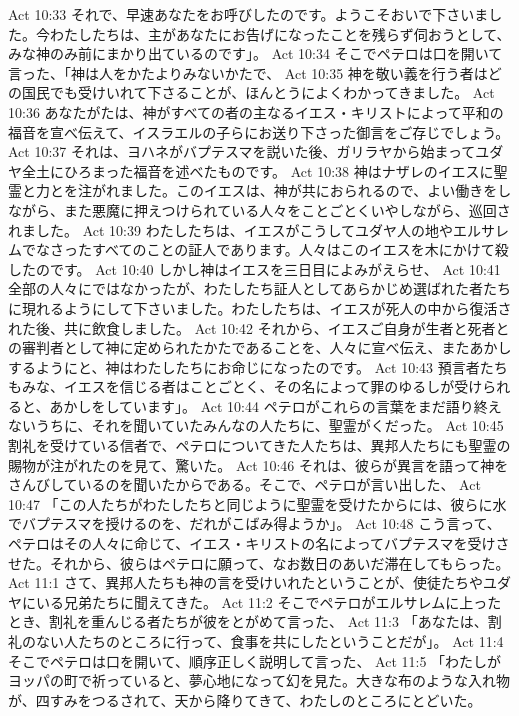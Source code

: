 Act 10:33  それで、早速あなたをお呼びしたのです。ようこそおいで下さいました。今わたしたちは、主があなたにお告げになったことを残らず伺おうとして、みな神のみ前にまかり出ているのです」。
Act 10:34  そこでペテロは口を開いて言った、「神は人をかたよりみないかたで、
Act 10:35  神を敬い義を行う者はどの国民でも受けいれて下さることが、ほんとうによくわかってきました。
Act 10:36  あなたがたは、神がすべての者の主なるイエス・キリストによって平和の福音を宣べ伝えて、イスラエルの子らにお送り下さった御言をご存じでしょう。
Act 10:37  それは、ヨハネがバプテスマを説いた後、ガリラヤから始まってユダヤ全土にひろまった福音を述べたものです。
Act 10:38  神はナザレのイエスに聖霊と力とを注がれました。このイエスは、神が共におられるので、よい働きをしながら、また悪魔に押えつけられている人々をことごとくいやしながら、巡回されました。
Act 10:39  わたしたちは、イエスがこうしてユダヤ人の地やエルサレムでなさったすべてのことの証人であります。人々はこのイエスを木にかけて殺したのです。
Act 10:40  しかし神はイエスを三日目によみがえらせ、
Act 10:41  全部の人々にではなかったが、わたしたち証人としてあらかじめ選ばれた者たちに現れるようにして下さいました。わたしたちは、イエスが死人の中から復活された後、共に飲食しました。
Act 10:42  それから、イエスご自身が生者と死者との審判者として神に定められたかたであることを、人々に宣べ伝え、またあかしするようにと、神はわたしたちにお命じになったのです。
Act 10:43  預言者たちもみな、イエスを信じる者はことごとく、その名によって罪のゆるしが受けられると、あかしをしています」。
Act 10:44  ペテロがこれらの言葉をまだ語り終えないうちに、それを聞いていたみんなの人たちに、聖霊がくだった。
Act 10:45  割礼を受けている信者で、ペテロについてきた人たちは、異邦人たちにも聖霊の賜物が注がれたのを見て、驚いた。
Act 10:46  それは、彼らが異言を語って神をさんびしているのを聞いたからである。そこで、ペテロが言い出した、
Act 10:47  「この人たちがわたしたちと同じように聖霊を受けたからには、彼らに水でバプテスマを授けるのを、だれがこばみ得ようか」。
Act 10:48  こう言って、ペテロはその人々に命じて、イエス・キリストの名によってバプテスマを受けさせた。それから、彼らはペテロに願って、なお数日のあいだ滞在してもらった。
Act 11:1  さて、異邦人たちも神の言を受けいれたということが、使徒たちやユダヤにいる兄弟たちに聞えてきた。
Act 11:2  そこでペテロがエルサレムに上ったとき、割礼を重んじる者たちが彼をとがめて言った、
Act 11:3  「あなたは、割礼のない人たちのところに行って、食事を共にしたということだが」。
Act 11:4  そこでペテロは口を開いて、順序正しく説明して言った、
Act 11:5  「わたしがヨッパの町で祈っていると、夢心地になって幻を見た。大きな布のような入れ物が、四すみをつるされて、天から降りてきて、わたしのところにとどいた。

